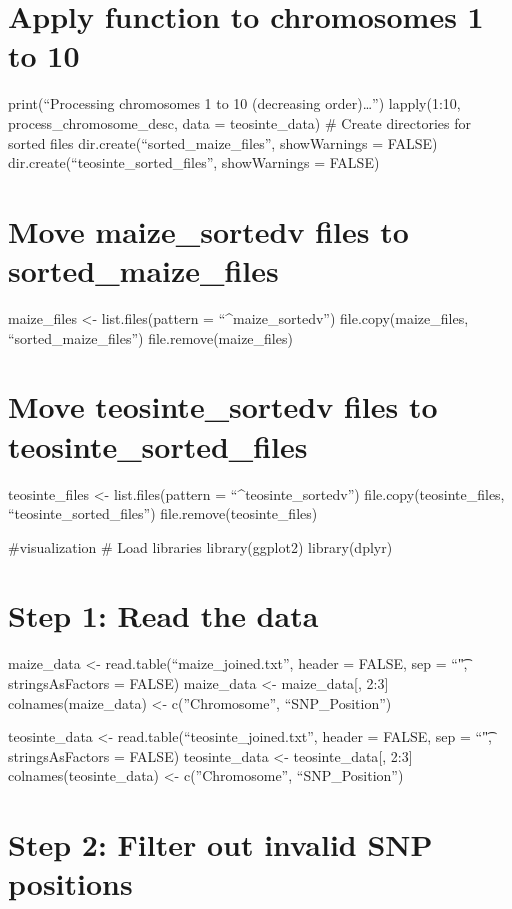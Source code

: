 \documentclass[
]{article}
\begin{document}
\section{Apply function to chromosomes 1 to
10}\label{apply-function-to-chromosomes-1-to-10-3}

print(``Processing chromosomes 1 to 10 (decreasing order)\ldots{}'')
lapply(1:10, process\_chromosome\_desc, data = teosinte\_data) \# Create
directories for sorted files dir.create(``sorted\_maize\_files'',
showWarnings = FALSE) dir.create(``teosinte\_sorted\_files'',
showWarnings = FALSE)

\section{Move maize\_sortedv files to
sorted\_maize\_files}\label{move-maize_sortedv-files-to-sorted_maize_files}

maize\_files \textless- list.files(pattern = ``\^{}maize\_sortedv'')
file.copy(maize\_files, ``sorted\_maize\_files'')
file.remove(maize\_files)

\section{Move teosinte\_sortedv files to
teosinte\_sorted\_files}\label{move-teosinte_sortedv-files-to-teosinte_sorted_files}

teosinte\_files \textless- list.files(pattern =
``\^{}teosinte\_sortedv'') file.copy(teosinte\_files,
``teosinte\_sorted\_files'') file.remove(teosinte\_files)

\#visualization \# Load libraries library(ggplot2) library(dplyr)

\section{Step 1: Read the data}\label{step-1-read-the-data}

maize\_data \textless- read.table(``maize\_joined.txt'', header = FALSE,
sep = ``\t", stringsAsFactors = FALSE) maize\_data \textless-
maize\_data{[}, 2:3{]} colnames(maize\_data) \textless-
c(''Chromosome'', ``SNP\_Position'')

teosinte\_data \textless- read.table(``teosinte\_joined.txt'', header =
FALSE, sep = ``\t", stringsAsFactors = FALSE) teosinte\_data \textless-
teosinte\_data{[}, 2:3{]} colnames(teosinte\_data) \textless-
c(''Chromosome'', ``SNP\_Position'')

\section{Step 2: Filter out invalid SNP
positions}\label{step-2-filter-out-invalid-snp-positions}
\end{document}
